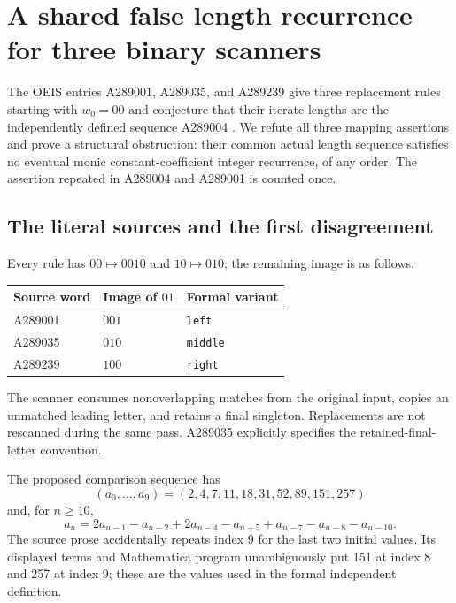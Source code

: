 \section{A shared false length recurrence for three binary scanners}
\label{sec:a289004}

The OEIS entries A289001, A289035, and A289239 give three replacement rules
starting with $w_0=00$ and conjecture that their iterate lengths are the
independently defined sequence A289004
\cite{A289001,A289004,A289035,A289239}.
We refute all three mapping assertions and prove a structural obstruction:
their common actual length sequence satisfies no eventual monic
constant-coefficient integer recurrence, of any order.
The assertion repeated in A289004 and A289001 is counted once.

\subsection{The literal sources and the first disagreement}

Every rule has $00\mapsto0010$ and $10\mapsto010$; the remaining image is
as follows.
\begin{center}
\begin{tabular}{lll}
\hline
Source word & Image of $01$ & Formal variant\\
\hline
A289001 & $001$ & \texttt{left}\\
A289035 & $010$ & \texttt{middle}\\
A289239 & $100$ & \texttt{right}\\
\hline
\end{tabular}
\end{center}
The scanner consumes nonoverlapping matches from the original input, copies
an unmatched leading letter, and retains a final singleton. Replacements
are not rescanned during the same pass. A289035 explicitly specifies the
retained-final-letter convention.

The proposed comparison sequence has
\[
 (a_0,\ldots,a_9)=(2,4,7,11,18,31,52,89,151,257)
\]
and, for $n\ge10$,
\begin{equation}
 a_n=2a_{n-1}-a_{n-2}+2a_{n-4}-a_{n-5}
       +a_{n-7}-a_{n-8}-a_{n-10}.
 \label{eq:a289004:claimed}
\end{equation}
The source prose accidentally repeats index 9 for the last two initial
values. Its displayed terms and Mathematica program unambiguously put 151
at index 8 and 257 at index 9; these are the values used in the formal
independent definition.

